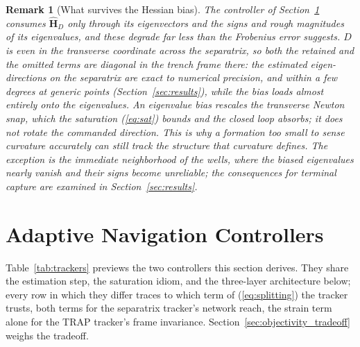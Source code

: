 \documentclass[lettersize,journal]{IEEEtran}
\newtheorem{remark}{Remark}
\begin{document}
\begin{remark}[What survives the Hessian bias]
\label{rem:eigvec}
The controller of Section~\ref{sec:controllers} consumes
$\hat{\mathbf{H}}_D$ only through its eigenvectors and the signs and
rough magnitudes of its eigenvalues, and these degrade far less than
the Frobenius error suggests. $D$ is even in the transverse coordinate
across the separatrix, so both the retained and the omitted terms are
diagonal in the trench frame there: the estimated eigen-directions on
the separatrix are exact to numerical precision, and within a few
degrees at generic points (Section~\ref{sec:results}), while the bias
loads almost entirely onto the eigenvalues. An eigenvalue bias rescales
the transverse Newton snap, which the saturation (\ref{eq:sat}) bounds
and the closed loop absorbs; it does not rotate the commanded
direction. This is why a formation too small to sense curvature
accurately can still track the structure that curvature defines. The
exception is the immediate neighborhood of the wells, where the biased
eigenvalues nearly vanish and their signs become unreliable; the
consequences for terminal capture are examined in
Section~\ref{sec:results}.
\end{remark}


\section{Adaptive Navigation Controllers}
\label{sec:controllers}

Table~\ref{tab:trackers} previews the two controllers this section
derives. They share the estimation step, the saturation idiom, and the
three-layer architecture below; every row in which they differ traces
to which term of (\ref{eq:splitting}) the tracker trusts, both terms
for the separatrix tracker's network reach, the strain term alone for
the TRAP tracker's frame invariance.
Section~\ref{sec:objectivity_tradeoff} weighs the tradeoff.
\end{document}

